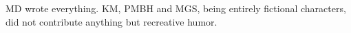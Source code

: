 MD wrote everything. KM, PMBH and MGS, being entirely fictional
characters, did not contribute anything but recreative humor.
